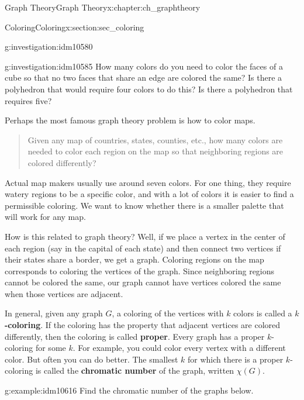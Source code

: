 \documentclass[oneside,10pt,]{book}
\newcommand{\terminology}[1]{\textbf{#1}}
\numberwithin{equation}{chapter}
\begin{document}
\begin{chapterptx}{Graph Theory}{}{Graph Theory}{}{}{x:chapter:ch_graphtheory}
\begin{sectionptx}{Coloring}{}{Coloring}{}{}{x:section:sec_coloring}
\begin{introduction}{}
\begin{investigation}{}{g:investigation:idm10580}
\begin{sidebyside}{1}{0.25}{0.25}{0}
\begin{sbspanel}{0.5}
{
}%
\end{sbspanel}%
\end{sidebyside}%
\end{investigation}
\begin{investigation}{}{g:investigation:idm10585}%
How many colors do you need to color the faces of a cube so that no two faces that share an edge are colored the same?  Is there a polyhedron that would require four colors to do this?  Is there a polyhedron that requires five?%
\end{investigation}
Perhaps the most famous graph theory problem is how to color maps.%
\begin{quote}%
Given any map of countries, states, counties, etc., how many colors are needed to color each region on the map so that neighboring regions are colored differently?%
\end{quote}
Actual map makers usually use around seven colors. For one thing, they require watery regions to be a specific color, and with a lot of colors it is easier to find a permissible coloring. We want to know whether there is a smaller palette that will work for any map.%
\par
How is this related to graph theory? Well, if we place a vertex in the center of each region (say in the capital of each state) and then connect two vertices if their states share a border, we get a graph. Coloring regions on the map corresponds to coloring the vertices of the graph. Since neighboring regions cannot be colored the same, our graph cannot have vertices colored the same when those vertices are adjacent.%
\par
In general, given any graph \(G\), a coloring of the vertices with \(k\) colors is called a \terminology{\(k\)-coloring}. If the coloring has the property that adjacent vertices are colored differently, then the coloring is called \terminology{proper}. Every graph has a proper \(k\)-coloring for some \(k\). For example, you could color every vertex with a different color. But often you can do better. The smallest \(k\) for which there is a proper \(k\)-coloring is called the \terminology{chromatic number} of the graph, written \(\chi(G)\)\label{g:notation:idm10612}.%
\begin{example}{}{g:example:idm10616}%
Find the chromatic number of the graphs below.%

\end{example}
\end{introduction}
\end{sectionptx}
\end{chapterptx}
\end{document}
